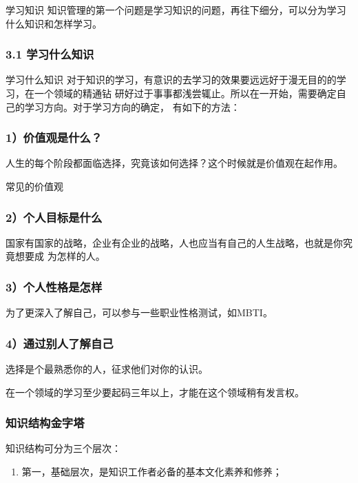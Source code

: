 \documentclass[11pt]{ctexart}
\begin{document}
{{{{学习知识
知识管理的第一个问题是学习知识的问题，再往下细分，可以分为学习什么知识和怎样学习。

\subsubsection{3.1 学习什么知识}
\label{sec:org0ab1fd9}

学习什么知识
对于知识的学习，有意识的去学习的效果要远远好于漫无目的的学习，在一个领域的精通钻
研好过于事事都浅尝辄止。所以在一开始，需要确定自己的学习方向。对于学习方向的确定，
有如下的方法：

\subsubsection{1）价值观是什么？}
\label{sec:orgdd4c372}

人生的每个阶段都面临选择，究竟该如何选择？这个时候就是价值观在起作用。


常见的价值观
\subsubsection{2）个人目标是什么}
\label{sec:org2271f72}

国家有国家的战略，企业有企业的战略，人也应当有自己的人生战略，也就是你究竟想要成
为怎样的人。

\subsubsection{3）个人性格是怎样}
\label{sec:org6cdeeca}

为了更深入了解自己，可以参与一些职业性格测试，如MBTI。

\subsubsection{4）通过别人了解自己}
\label{sec:orgdff3b8c}

选择是个最熟悉你的人，征求他们对你的认识。

在一个领域的学习至少要起码三年以上，才能在这个领域稍有发言权。


\subsubsection{知识结构金字塔}
\label{sec:org3a0a3cb}
知识结构可分为三个层次：

\begin{enumerate}
\item 第一，基础层次，是知识工作者必备的基本文化素养和修养；
\label{sec:org737dd7e}


\end{enumerate}}}}}
\end{document}
